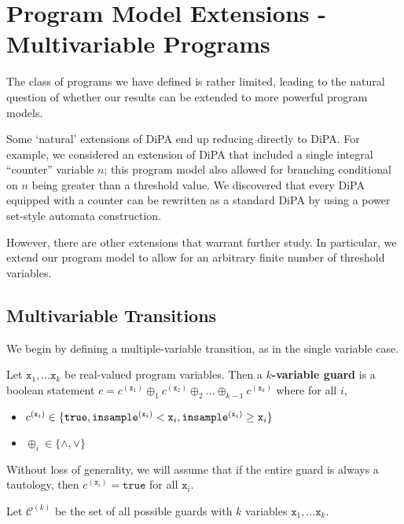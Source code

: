 
\section{Program Model Extensions - Multivariable Programs}



The class of programs we have defined is rather limited, leading to the natural question of whether our results can be extended to more powerful program models. 

Some `natural' extensions of DiPA end up reducing directly to DiPA. For example, we considered an extension of DiPA that included a single integral ``counter'' variable $n$; this program model also allowed for branching conditional on $n$ being greater than a threshold value. 
We discovered that every DiPA equipped with a counter can be rewritten as a standard DiPA by using a power set-style automata construction. 

However, there are other extensions that warrant further study. In particular, we extend our program model to allow for an arbitrary finite number of threshold variables.

\subsection{Multivariable Transitions}

We begin by defining a multiple-variable transition, as in the single variable case. 

\begin{defn}
    Let $\texttt{x}_1, \ldots \texttt{x}_k$ be real-valued program variables. Then a \textbf{$k$-variable guard} is a boolean statement $c = c^{(\texttt{x}_1)}\oplus_1 c^{(\texttt{x}_2)}\oplus_2\ldots\oplus_{k-1}c^{(\texttt{x}_k)}$ where for all $i$, \begin{itemize}
        \item $c^{(\texttt{x}_i)}\in \{\texttt{true}, \mvlguard[\texttt{x}_i], \mvgguard[\texttt{x}_i]\}$
        \item $\oplus_i \in \{\land, \lor\}$
    \end{itemize}
    Without loss of generality, we will assume that if the entire guard is always a tautology, then $c^{(\texttt{x}_i)}=\texttt{true}$ for all $\texttt{x}_i$. 
    
    

    Let $\mathcal{C}^{(k)}$ be the set of all possible guards with $k$ variables $\texttt{x}_1, \ldots \texttt{x}_k$.
\end{defn}

